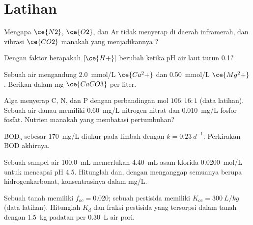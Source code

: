 \section{Latihan}

\begin{exercise}[$\star$]\label{exo:b3:environmental-toxicology:1}
Mengapa $\ce{N2}$, $\ce{O2}$, dan Ar tidak menyerap di daerah inframerah, dan vibrasi $\ce{CO2}$ manakah yang menjadikannya
?
\end{exercise}

\begin{exercise}[$\star$]\label{exo:b3:environmental-toxicology:2}
Dengan faktor berapakah $[\ce{H+}]$ berubah ketika pH air laut turun 0.1?
\end{exercise}

\begin{exercise}[$\star$]\label{exo:b3:environmental-toxicology:3}
Sebuah air mengandung \qty{2.0}{mmol/L} $\ce{Ca^2+}$ dan \qty{0.50}{mmol/L} $\ce{Mg^2+}$. Berikan  dalam mg $\ce{CaCO3}$ per liter.
\end{exercise}

\begin{exercise}[$\star$]\label{exo:b3:environmental-toxicology:4}
Alga menyerap C, N, dan P dengan perbandingan mol $106 : 16 : 1$ (data latihan). Sebuah air danau
memiliki \qty{0.60}{mg/L} nitrogen nitrat dan \qty{0.010}{mg/L} fosfor fosfat. Nutrien manakah yang membatasi
pertumbuhan?
\end{exercise}

\begin{exercise}[$\star\star$]\label{exo:b3:environmental-toxicology:5}
$\mathrm{BOD_5}$ sebesar \qty{170}{mg/L} diukur pada limbah dengan $k = \qty{0.23}{d^{-1}}$. Perkirakan BOD akhirnya.
\end{exercise}

\begin{exercise}[$\star\star$]\label{exo:b3:environmental-toxicology:6}
Sebuah sampel air \qty{100.0}{mL} memerlukan \qty{4.40}{mL} asam klorida \qty{0.0200}{mol/L} untuk mencapai pH 4.5. Hitunglah
 dan, dengan menganggap semuanya berupa hidrogenkarbonat, konsentrasinya dalam mg/L.
\end{exercise}

\begin{exercise}[$\star\star$]\label{exo:b3:environmental-toxicology:7}
Sebuah tanah memiliki $f_{oc} = 0.020$; sebuah pestisida memiliki $K_{oc} = \qty{300}{L/kg}$ (data latihan). Hitunglah $K_d$ dan
fraksi pestisida yang tersorpsi dalam tanah dengan \qty{1.5}{kg} padatan per \qty{0.30}{L} air pori.
\end{exercise}

